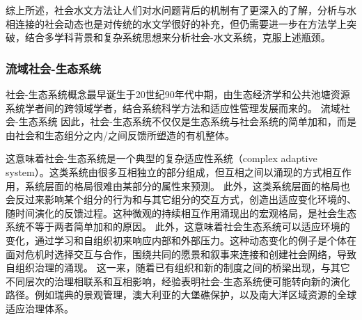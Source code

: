 综上所述，社会水文方法让人们对水问题背后的机制有了更深入的了解，分析与水相连接的社会动态也是对传统的水文学很好的补充，但仍需要进一步在方法学上突破，结合多学科背景和复杂系统思想来分析社会-水文系统，克服上述瓶颈。


\subsubsection*{流域社会-生态系统}
社会-生态系统概念最早诞生于20世纪90年代中期，由生态经济学和公共池塘资源系统学者间的跨领域学者，结合系统科学方法和适应性管理发展而来的\cite{biggs2021}。
流域社会-生态系统
因此，社会-生态系统不仅仅是生态系统与社会系统的简单加和，而是由社会和生态组分之内/之间反馈所塑造的有机整体。

这意味着社会-生态系统是一个典型的复杂适应性系统（complex adaptive system）。这类系统由很多互相独立的部分组成，但互相之间以涌现的方式相互作用，系统层面的格局很难由某部分的属性来预测。
此外，这类系统层面的格局也会反过来影响某个组分的行为和与其它组分的交互方式，创造出适应变化环境的、随时间演化的反馈过程。这种微观的持续相互作用涌现出的宏观格局，是社会生态系统不等于两者简单加和的原因。
此外，这意味着社会生态系统可以适应环境的变化，通过学习和自组织初来响应内部和外部压力。这种动态变化的例子是个体在面对危机时选择交互与合作，围绕共同的愿景和叙事来连接和创建社会网络，导致自组织治理的涌现。
这一来，随着已有组织和新的制度之间的桥梁出现，与其它不同层次的治理相联系和互相影响，经验表明社会-生态系统便可能转向新的演化路径。例如瑞典的景观管理，澳大利亚的大堡礁保护，以及南大洋区域资源的全球适应治理体系。
